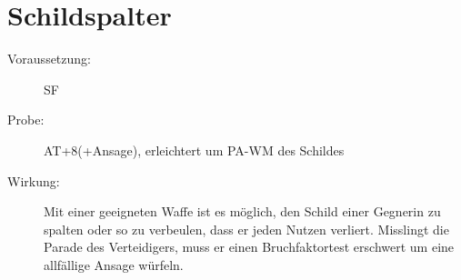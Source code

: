 \section{Schildspalter}
\label{aktion.schildspalter}
\begin{description}
    \item[Voraussetzung:]
        SF 
    \item[Probe:]
        AT+8(+Ansage), erleichtert um PA-WM des Schildes
    \item[Wirkung:]
        Mit einer geeigneten Waffe ist es möglich, den Schild einer Gegnerin zu spalten oder so zu verbeulen, dass er jeden Nutzen verliert.
        Misslingt die Parade des Verteidigers, muss er einen Bruchfaktortest erschwert um eine allfällige Ansage würfeln.
\end{description}
